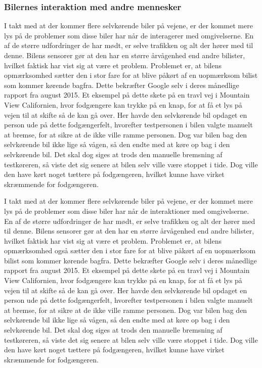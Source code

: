 \subsubsection{Bilernes interaktion med andre mennesker}

I takt med at der kommer flere selvkørende biler på vejene, er der kommet mere lys på de problemer som disse biler har når de interagerer med omgivelserne. En af de større udfordringer de har mødt, er selve trafikken og alt der hører med til denne. Bilens sensorer gør at den har en større årvågenhed end andre bilister, hvilket faktisk har vist sig at være et problem. Problemet er, at bilens opmærksomhed sætter den i stor fare for at blive påkørt af en uopmærksom bilist som kommer kørende bagfra. Dette bekræfter Google selv i deres månedlige rapport fra august 2015\cite{GOOG_MONTHLY}. Et eksempel på dette skete på en travl vej i Mountain View Californien, hvor fodgængere kan trykke på en knap, for at få et lys på vejen til at skifte så de kan gå over. Her havde den selvkørende bil opdaget en person ude på dette fodgængerfelt, hvorefter testpersonen i bilen valgte manuelt at bremse, for at sikre at de ikke ville ramme personen. Dog var bilen bag den selvkørende bil ikke lige så vågen, så den endte med at køre op bag i den selvkørende bil. Det skal dog siges at trods den manuelle bremsning af testkøreren, så viste det sig senere at bilen selv ville være stoppet i tide. Dog ville den have kørt noget tættere på fodgængeren, hvilket kunne have virket skræmmende for fodgængeren\cite{GOOG_MONTHLY}. 

\label{interaktion}
I takt med at der kommer flere selvkørende biler på vejene, er der kommet mere lys på de problemer som disse biler har når de interaktioner med omgivelserne. En af de større udfordringer de har mødt, er selve trafikken og alt der hører med til denne. Bilens sensorer gør at den har en større årvågenhed end andre bilister, hvilket faktisk har vist sig at være et problem. Problemet er, at bilens opmærksomhed også sætter den i stor fare for at blive påkørt af en uopmærksom bilist som kommer kørende bagfra. Dette bekræfter Google selv i deres månedlige rapport fra august 2015\cite{GOOG_MONTHLY}. Et eksempel på dette skete på en travl vej i Mountain View Californien, hvor fodgængere kan trykke på en knap, for at få et lys på vejen til at skifte så de kan gå over. Her havde den selvkørende bil opdaget en person ude på dette fodgængerfelt, hvorefter testpersonen i bilen valgte manuelt at bremse, for at sikre at de ikke ville ramme personen. Dog var bilen bag den selvkørende bil ikke lige så vågen, så den endte med at køre op bag i den selvkørende bil. Det skal dog siges at trods den manuelle bremsning af testkøreren, så viste det sig senere at bilen selv ville være stoppet i tide. Dog ville den have kørt noget tættere på fodgængeren, hvilket kunne have virket skræmmende for fodgængeren\cite{GOOG_MONTHLY}. 


